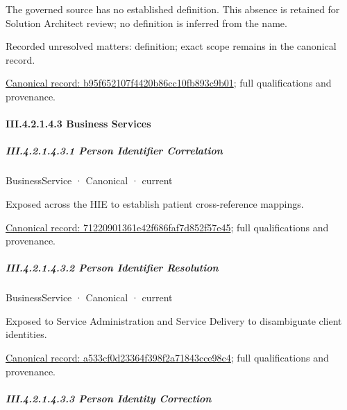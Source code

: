 The governed source has no established definition. This absence is retained for Solution Architect review; no definition is inferred from the name.


{\small Recorded unresolved matters: definition; exact scope remains in the canonical record.}\par
{\footnotesize \href{../../../../../../../continuum/business/business-service/b95f652107f4420b86cc10fb893c9b01.md}{Canonical record: b95f652107f4420b86cc10fb893c9b01}; full qualifications and provenance.}\par
\paragraph*{III.4.2.1.4.3 Business Services}
\label{navigation:III.4.2.1.4.3}

\subparagraph*{III.4.2.1.4.3.1 Person Identifier Correlation}
\label{navigation:III.4.2.1.4.3.1}

\label{element:71220901361e42f686faf7d852f57e45}
{\small BusinessService · Canonical · current}\par

Exposed across the HIE to establish patient cross-reference mappings.


{\footnotesize \href{../../../../../../../continuum/business/business-service/71220901361e42f686faf7d852f57e45.md}{Canonical record: 71220901361e42f686faf7d852f57e45}; full qualifications and provenance.}\par
\subparagraph*{III.4.2.1.4.3.2 Person Identifier Resolution}
\label{navigation:III.4.2.1.4.3.2}

\label{element:a533cf0d23364f398f2a71843cce98c4}
{\small BusinessService · Canonical · current}\par

Exposed to Service Administration and Service Delivery to disambiguate client identities.


{\footnotesize \href{../../../../../../../continuum/business/business-service/a533cf0d23364f398f2a71843cce98c4.md}{Canonical record: a533cf0d23364f398f2a71843cce98c4}; full qualifications and provenance.}\par
\subparagraph*{III.4.2.1.4.3.3 Person Identity Correction}
\label{navigation:III.4.2.1.4.3.3}

